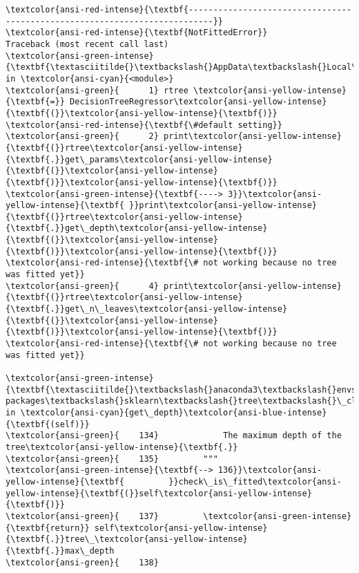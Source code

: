 \documentclass[11pt]{article}
\begin{document}
    \begin{Verbatim}[commandchars=\\\{\}, frame=single, framerule=2mm, rulecolor=\color{outerrorbackground}]
\textcolor{ansi-red-intense}{\textbf{---------------------------------------------------------------------------}}
\textcolor{ansi-red-intense}{\textbf{NotFittedError}}                            Traceback (most recent call last)
\textcolor{ansi-green-intense}{\textbf{\textasciitilde{}\textbackslash{}AppData\textbackslash{}Local\textbackslash{}Temp\textbackslash{}ipykernel\_16280\textbackslash{}3357154144.py}} in \textcolor{ansi-cyan}{<module>}
\textcolor{ansi-green}{      1} rtree \textcolor{ansi-yellow-intense}{\textbf{=}} DecisionTreeRegressor\textcolor{ansi-yellow-intense}{\textbf{(}}\textcolor{ansi-yellow-intense}{\textbf{)}} \textcolor{ansi-red-intense}{\textbf{\#default setting}}
\textcolor{ansi-green}{      2} print\textcolor{ansi-yellow-intense}{\textbf{(}}rtree\textcolor{ansi-yellow-intense}{\textbf{.}}get\_params\textcolor{ansi-yellow-intense}{\textbf{(}}\textcolor{ansi-yellow-intense}{\textbf{)}}\textcolor{ansi-yellow-intense}{\textbf{)}}
\textcolor{ansi-green-intense}{\textbf{----> 3}}\textcolor{ansi-yellow-intense}{\textbf{ }}print\textcolor{ansi-yellow-intense}{\textbf{(}}rtree\textcolor{ansi-yellow-intense}{\textbf{.}}get\_depth\textcolor{ansi-yellow-intense}{\textbf{(}}\textcolor{ansi-yellow-intense}{\textbf{)}}\textcolor{ansi-yellow-intense}{\textbf{)}} \textcolor{ansi-red-intense}{\textbf{\# not working because no tree was fitted yet}}
\textcolor{ansi-green}{      4} print\textcolor{ansi-yellow-intense}{\textbf{(}}rtree\textcolor{ansi-yellow-intense}{\textbf{.}}get\_n\_leaves\textcolor{ansi-yellow-intense}{\textbf{(}}\textcolor{ansi-yellow-intense}{\textbf{)}}\textcolor{ansi-yellow-intense}{\textbf{)}} \textcolor{ansi-red-intense}{\textbf{\# not working because no tree was fitted yet}}

\textcolor{ansi-green-intense}{\textbf{\textasciitilde{}\textbackslash{}anaconda3\textbackslash{}envs\textbackslash{}I2ML\_env\textbackslash{}lib\textbackslash{}site-packages\textbackslash{}sklearn\textbackslash{}tree\textbackslash{}\_classes.py}} in \textcolor{ansi-cyan}{get\_depth}\textcolor{ansi-blue-intense}{\textbf{(self)}}
\textcolor{ansi-green}{    134}             The maximum depth of the tree\textcolor{ansi-yellow-intense}{\textbf{.}}
\textcolor{ansi-green}{    135}         """
\textcolor{ansi-green-intense}{\textbf{--> 136}}\textcolor{ansi-yellow-intense}{\textbf{         }}check\_is\_fitted\textcolor{ansi-yellow-intense}{\textbf{(}}self\textcolor{ansi-yellow-intense}{\textbf{)}}
\textcolor{ansi-green}{    137}         \textcolor{ansi-green-intense}{\textbf{return}} self\textcolor{ansi-yellow-intense}{\textbf{.}}tree\_\textcolor{ansi-yellow-intense}{\textbf{.}}max\_depth
\textcolor{ansi-green}{    138} 


\end{Verbatim}
\end{document}
